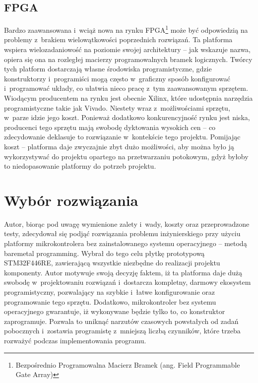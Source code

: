 \subsection{FPGA}
\label{FPGA}
Bardzo zaawansowana i~wciąż nowa na rynku FPGA\footnote{Bezpośrednio Programowalna Macierz Bramek (ang. Field Programmable Gate Array)} może być odpowiedzią na problemy z~brakiem wielowątkowości poprzednich rozwiązań. Ta platforma wspiera wielozadaniowość na poziomie swojej architektury -- jak wskazuje nazwa, opiera się ona na rozległej macierzy programowalnych bramek logicznych. Twórcy tych platform dostarczają własne środowiska programistyczne, gdzie konstruktorzy i~programiści mogą często w~graficzny sposób konfigurować i~programować układy, co ułatwia nieco pracę z~tym zaawansowanym sprzętem. Wiodącym producentem na rynku jest obecnie Xilinx, które udostępnia narzędzia programistyczne takie jak Vivado. Niestety wraz z~możliwościami sprzętu, w~parze idzie jego koszt. Ponieważ dodatkowo konkurencyjność rynku jest niska, producenci tego sprzętu mają swobodę dyktowania wysokich cen -- co zdecydowanie deklasuje to rozwiązanie w~kontekście tego projektu. Pomijając koszt -- platforma daje zwyczajnie zbyt dużo możliwości, aby można było ją wykorzystywać do projektu opartego na przetwarzaniu potokowym, gdyż byłoby to niedopasowanie platformy do potrzeb projektu.
\section{Wybór rozwiązania}
\label{sec:wybór}
Autor, biorąc pod uwagę wymienione zalety i~wady, koszty oraz przeprowadzone testy, zdecydował się podjąć rozwiązania problemu inżynierskiego przy użyciu platformy mikrokontrolera bez zainstalowanego systemu operacyjnego -- metodą baremetal programming. Wybrał do tego celu płytkę prototypową STM32F446RE, zawierającą wszystkie niezbędne do realizacji projektu komponenty. Autor motywuje swoją decyzję faktem, iż ta platforma daje dużą swobodę w~projektowaniu rozwiązań i~dostarcza kompletny, darmowy ekosystem programistyczny, pozwalający na szybkie i~łatwe konfigurowanie oraz programowanie tego sprzętu. Dodatkowo, mikrokontroler bez systemu operacyjnego gwarantuje, iż wykonywane będzie tylko to, co konstruktor zaprogramuje. Pozwala to uniknąć narzutów czasowych powstałych od zadań pobocznych i~zostawia programistę z~mniejszą liczbą czynników, które trzeba rozważyć podczas implementowania programu.
